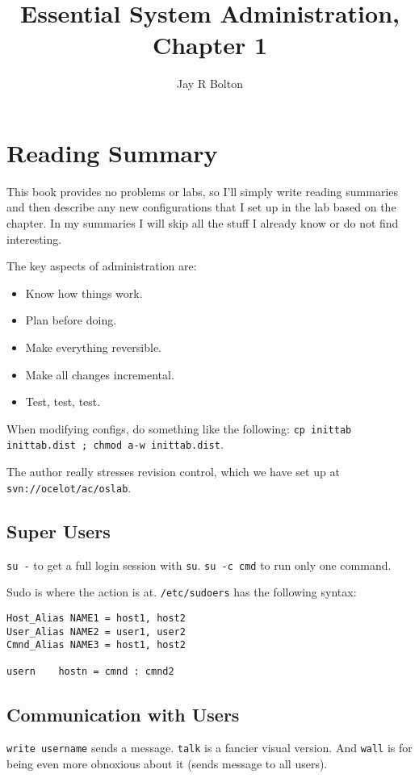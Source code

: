 \documentclass{article}
\title{Essential System Administration, Chapter 1}
\author{Jay R Bolton}
\begin{document}
\maketitle

\section*{Reading Summary}
This book provides no problems or labs, so I'll simply write reading summaries
and then describe any new configurations that I set up in the lab based on the
chapter. In my summaries I will skip all the stuff I already know or do not
find interesting.

The key aspects of administration are:
\begin{itemize}
\item Know how things work.
\item Plan before doing.
\item Make everything reversible.
\item Make all changes incremental.
\item Test, test, test.
\end{itemize}

When modifying configs, do something like the following: \texttt{cp inittab inittab.dist ; chmod a-w inittab.dist}.

The author really stresses revision control, which we have set up at \texttt{svn://ocelot/ac/oslab}.

\subsection*{Super Users}

\texttt{su -} to get a full login session with \texttt{su}. \texttt{su -c cmd} to run only one command. 

Sudo is where the action is at. \texttt{/etc/sudoers} has the following syntax:

\begin{verbatim}
Host_Alias NAME1 = host1, host2
User_Alias NAME2 = user1, user2
Cmnd_Alias NAME3 = host1, host2

usern    hostn = cmnd : cmnd2
\end{verbatim}

\subsection*{Communication with Users}

\texttt{write username} sends a message. \texttt{talk} is a fancier visual version. And \texttt{wall} is for being even more obnoxious about it (sends message to all users). 
\end{document}
